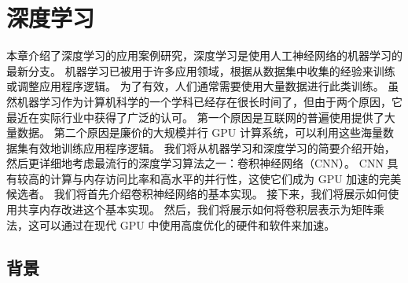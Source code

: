 \section{深度学习}
本章介绍了深度学习的应用案例研究，深度学习是使用人工神经网络的机器学习的最新分支。 机器学习已被用于许多应用领域，根据从数据集中收集的经验来训练或调整应用程序逻辑。 为了有效，人们通常需要使用大量数据进行此类训练。 虽然机器学习作为计算机科学的一个学科已经存在很长时间了，但由于两个原因，它最近在实际行业中获得了广泛的认可。 第一个原因是互联网的普遍使用提供了大量数据。 第二个原因是廉价的大规模并行 GPU 计算系统，可以利用这些海量数据集有效地训练应用程序逻辑。 我们将从机器学习和深度学习的简要介绍开始，然后更详细地考虑最流行的深度学习算法之一：卷积神经网络（CNN）。 CNN 具有较高的计算与内存访问比率和高水平的并行性，这使它们成为 GPU 加速的完美候选者。 我们将首先介绍卷积神经网络的基本实现。 接下来，我们将展示如何使用共享内存改进这个基本实现。 然后，我们将展示如何将卷积层表示为矩阵乘法，这可以通过在现代 GPU 中使用高度优化的硬件和软件来加速。

\subsection{背景}